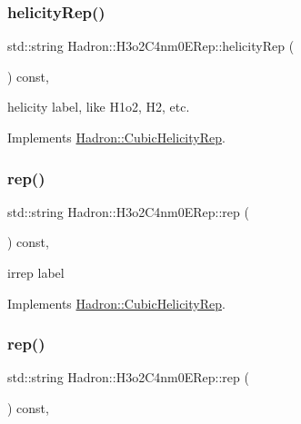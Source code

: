 \subsubsection{\texorpdfstring{helicityRep()}{helicityRep()}\hspace{0.1cm}{\footnotesize\ttfamily [3/3]}}
{\footnotesize\ttfamily std\+::string Hadron\+::\+H3o2\+C4nm0\+E\+Rep\+::helicity\+Rep (\begin{DoxyParamCaption}{ }\end{DoxyParamCaption}) const\hspace{0.3cm}{\ttfamily [inline]}, {\ttfamily [virtual]}}

helicity label, like H1o2, H2, etc. 

Implements \mbox{\hyperlink{structHadron_1_1CubicHelicityRep_af1096946b7470edf0a55451cc662f231}{Hadron\+::\+Cubic\+Helicity\+Rep}}.

\mbox{\label{structHadron_1_1H3o2C4nm0ERep_aba80c4eba2c70fb467683c3ea8d67aa8}} 
\subsubsection{\texorpdfstring{rep()}{rep()}\hspace{0.1cm}{\footnotesize\ttfamily [1/3]}}
{\footnotesize\ttfamily std\+::string Hadron\+::\+H3o2\+C4nm0\+E\+Rep\+::rep (\begin{DoxyParamCaption}{ }\end{DoxyParamCaption}) const\hspace{0.3cm}{\ttfamily [inline]}, {\ttfamily [virtual]}}

irrep label 

Implements \mbox{\hyperlink{structHadron_1_1CubicHelicityRep_a8cdd86f068a167dc96faef02bfb8a33d}{Hadron\+::\+Cubic\+Helicity\+Rep}}.

\mbox{\label{structHadron_1_1H3o2C4nm0ERep_aba80c4eba2c70fb467683c3ea8d67aa8}} 
\subsubsection{\texorpdfstring{rep()}{rep()}\hspace{0.1cm}{\footnotesize\ttfamily [2/3]}}
{\footnotesize\ttfamily std\+::string Hadron\+::\+H3o2\+C4nm0\+E\+Rep\+::rep (\begin{DoxyParamCaption}{ }\end{DoxyParamCaption}) const\hspace{0.3cm}{\ttfamily [inline]}, {\ttfamily [virtual]}}

